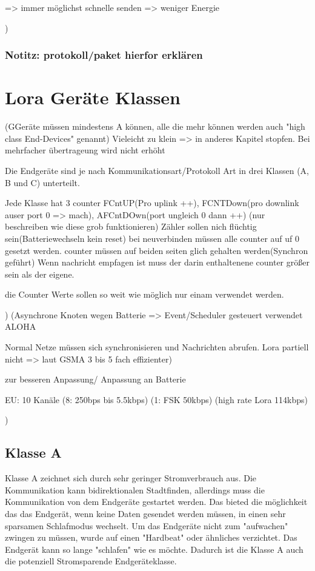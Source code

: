 \documentclass[a4paper,12pt]{article}
\begin{document}
                    => immer möglichst schnelle senden => weniger Energie

                )
                \subsubsection{Notitz: protokoll/paket hierfor erklären}
    \section{Lora Geräte Klassen}
        \cite{LoRaSpec}(GGeräte müssen mindestens A können, alle die mehr können werden auch "high class End-Devices" genannt)
        Vieleicht zu klein => in anderes Kapitel stopfen. Bei mehrfacher übertrageung wird nicht erhöht

        Die Endgeräte sind je nach Kommunikationsart/Protokoll Art in drei Klassen (A, B und C) unterteilt. 
        
        Jede Klasse hat 3 counter FCntUP(Pro uplink ++), FCNTDown(pro downlink auser port 0 => mach), AFCntDOwn(port ungleich 0 dann ++)   (nur beschreiben wie diese grob funktionieren) Zähler sollen nich flüchtig sein(Batteriewechseln kein reset)
        bei neuverbinden müssen alle counter auf uf 0 gesetzt werden. counter müssen auf beiden seiten glich gehalten werden(Synchron geführt)
        Wenn nachricht empfagen ist muss der darin enthaltenene counter größer sein als der eigene. 

        die Counter Werte sollen so weit wie möglich nur einam verwendet werden.
        
        )
        \cite{LoraClasses}
        \cite{WhatIsLoRa}(Asynchrone Knoten wegen Batterie => Event/Scheduler gesteuert verwendet ALOHA
        
        Normal Netze müssen sich synchronisieren und Nachrichten abrufen. Lora partiell nicht => laut GSMA 3 bis 5 fach effizienter)
    
        zur besseren Anpassung/ Anpassung an Batterie
        
        EU: 10 Kanäle (8: 250bps bis 5.5kbps) (1: FSK 50kbps) (high rate Lora 114kbps)

        )
        \subsection{Klasse A}\label{sec:ClassA}
            Klasse A zeichnet sich durch sehr geringer Stromverbrauch aus. Die Kommunikation kann bidirektionalen Stadtfinden, allerdings muss die Kommunikation von dem Endgeräte gestartet werden. Das bieted die möglichkeit das das Endgerät, wenn keine Daten gesendet werden müssen, in einen sehr
            sparsamen Schlafmodus wechselt. Um das Endgeräte nicht zum "aufwachen" zwingen zu müssen, wurde auf einen "Hardbeat" oder ähnliches verzichtet. Das Endgerät kann so lange "schlafen" wie es möchte. Dadurch ist die Klasse A auch die potenziell Stromsparende Endgeräteklasse.
            
\end{document}
